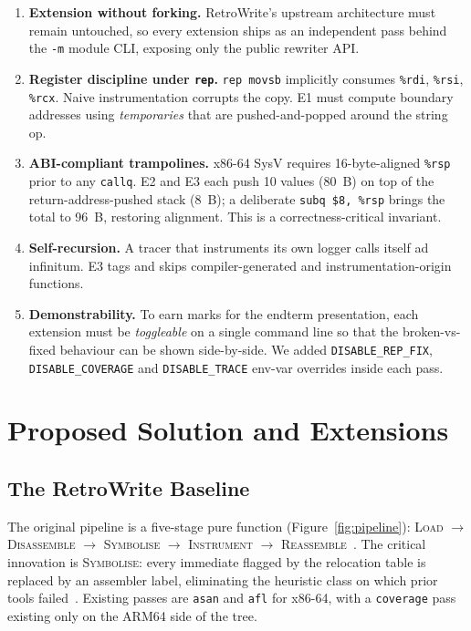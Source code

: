 \documentclass[10pt,a4paper]{article}
\begin{document}
\begin{enumerate}
\item \textbf{Extension without forking.} RetroWrite's upstream architecture
must remain untouched, so every extension ships as an independent pass behind
the \texttt{-m} module CLI, exposing only the public rewriter API.
\item \textbf{Register discipline under \texttt{rep}.} \texttt{rep movsb}
implicitly consumes \texttt{\%rdi}, \texttt{\%rsi}, \texttt{\%rcx}. Naive
instrumentation corrupts the copy. E1 must compute boundary addresses using
\emph{temporaries} that are pushed-and-popped around the string op.
\item \textbf{ABI-compliant trampolines.} x86-64 SysV requires
16-byte-aligned \texttt{\%rsp} prior to any \texttt{callq}. E2 and E3 each
push 10 values (80~B) on top of the return-address-pushed stack
(8~B); a deliberate \texttt{subq \$8, \%rsp} brings the total to 96~B,
restoring alignment. This is a correctness-critical invariant.
\item \textbf{Self-recursion.} A tracer that instruments its own logger calls
itself ad infinitum. E3 tags and skips compiler-generated and
instrumentation-origin functions.
\item \textbf{Demonstrability.} To earn marks for the endterm presentation,
each extension must be \emph{toggleable} on a single command line so that the
broken-vs-fixed behaviour can be shown side-by-side. We added
\texttt{DISABLE\_REP\_FIX}, \texttt{DISABLE\_COVERAGE} and
\texttt{DISABLE\_TRACE} env-var overrides inside each pass.
\end{enumerate}

\section{Proposed Solution and Extensions}

\subsection{The RetroWrite Baseline}

The original pipeline is a five-stage pure function
(Figure~\ref{fig:pipeline}): \textsc{Load} $\to$ \textsc{Disassemble} $\to$
\textsc{Symbolise} $\to$ \textsc{Instrument} $\to$
\textsc{Reassemble}~\cite{retrowrite}. The critical innovation is
\textsc{Symbolise}: every immediate flagged by the relocation table is
replaced by an assembler label, eliminating the heuristic class on which
prior tools failed~\cite{uroboros,ramblr}. Existing passes are
\texttt{asan} and \texttt{afl} for x86-64, with a \texttt{coverage} pass
existing only on the ARM64 side of the tree.
\end{document}
